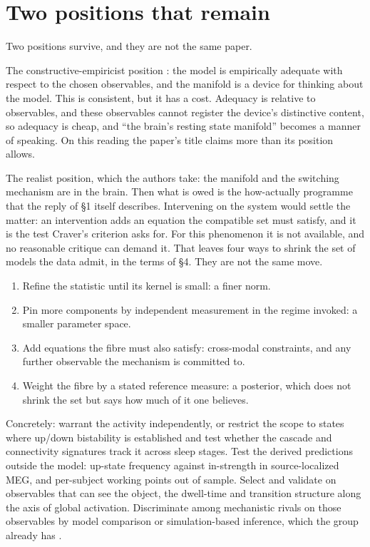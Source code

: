 \documentclass[11pt]{article}
\theoremstyle{definition}\newtheorem{observation}{Observation}
\theoremstyle{remark}\newtheorem{remark}{Remark}
\begin{document}
\section{Two positions that remain}
Two positions survive, and they are not the same paper.

The constructive-empiricist position \parencite{vanfraassen1980}: the model is empirically adequate with respect to the chosen observables, and the manifold is a device for thinking about the model. This is consistent, but it has a cost. Adequacy is relative to observables, and these observables cannot register the device's distinctive content, so adequacy is cheap, and ``the brain's resting state manifold'' becomes a manner of speaking. On this reading the paper's title claims more than its position allows.

The realist position, which the authors take: the manifold and the switching mechanism are in the brain. Then what is owed is the how-actually programme that the reply of \S1 itself describes. Intervening on the system would settle the matter: an intervention adds an equation the compatible set must satisfy, and it is the test Craver's criterion asks for. For this phenomenon it is not available, and no reasonable critique can demand it. That leaves four ways to shrink the set of models the data admit, in the terms of \S4. They are not the same move.
\begin{enumerate}
\item Refine the statistic until its kernel is small: a finer norm.
\item Pin more components by independent measurement in the regime invoked: a smaller parameter space.
\item Add equations the fibre must also satisfy: cross-modal constraints, and any further observable the mechanism is committed to.
\item Weight the fibre by a stated reference measure: a posterior, which does not shrink the set but says how much of it one believes.
\end{enumerate}
Concretely: warrant the activity independently, or restrict the scope to states where up/down bistability is established and test whether the cascade and connectivity signatures track it across sleep stages. Test the derived predictions outside the model: up-state frequency against in-strength in source-localized MEG, and per-subject working points out of sample. Select and validate on observables that can see the object, the dwell-time and transition structure along the axis of global activation. Discriminate among mechanistic rivals on those observables by model comparison or simulation-based inference, which the group already has \parencite{hashemi2024}.
\end{document}
